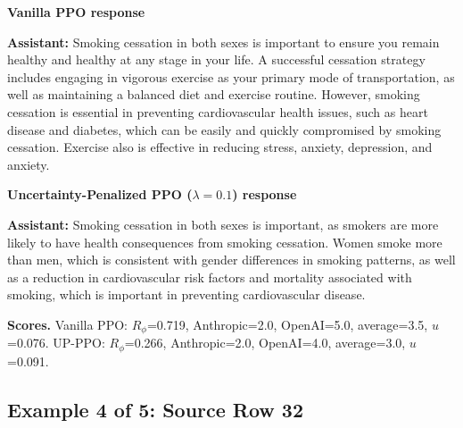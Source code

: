 \documentclass[twocolumn,10pt]{article}
\newcommand{\Rphi}{R_{\phi}}
\begin{document}
\begin{tcolorbox}[enhanced,breakable,colback=SoftRed,colframe=black!45,boxrule=0.35pt,arc=1.2mm,left=3pt,right=3pt,top=3pt,bottom=3pt,before skip=4pt,after skip=5pt]
\textbf{Vanilla PPO response}\par\smallskip
\textbf{Assistant:} Smoking cessation in both sexes is important to ensure you remain healthy and healthy at any stage in your life. A successful cessation strategy includes engaging in vigorous exercise as your primary mode of transportation, as well as maintaining a balanced diet and exercise routine. However, smoking cessation is essential in preventing cardiovascular health issues, such as heart disease and diabetes, which can be easily and quickly compromised by smoking cessation. Exercise also is effective in reducing stress, anxiety, depression, and anxiety.
\end{tcolorbox}


\begin{tcolorbox}[enhanced,breakable,colback=SoftBlue,colframe=black!45,boxrule=0.35pt,arc=1.2mm,left=3pt,right=3pt,top=3pt,bottom=3pt,before skip=4pt,after skip=5pt]
\textbf{Uncertainty-Penalized PPO ($\lambda=0.1$) response}\par\smallskip
\textbf{Assistant:} Smoking cessation in both sexes is important, as smokers are more likely to have health consequences from smoking cessation. Women smoke more than men, which is consistent with gender differences in smoking patterns, as well as a reduction in cardiovascular risk factors and mortality associated with smoking, which is important in preventing cardiovascular disease.
\end{tcolorbox}


\begin{tcolorbox}[enhanced,breakable,colback=white,colframe=black!35,boxrule=0.25pt,arc=1.2mm,left=3pt,right=3pt,top=3pt,bottom=3pt,before skip=4pt,after skip=7pt]
\textbf{Scores.} Vanilla PPO: $\Rphi$=0.719, Anthropic=2.0, OpenAI=5.0, average=3.5, $u$=0.076. UP-PPO: $\Rphi$=0.266, Anthropic=2.0, OpenAI=4.0, average=3.0, $u$=0.091.
\end{tcolorbox}


\subsection*{Example 4 of 5: Source Row 32}
\end{document}
